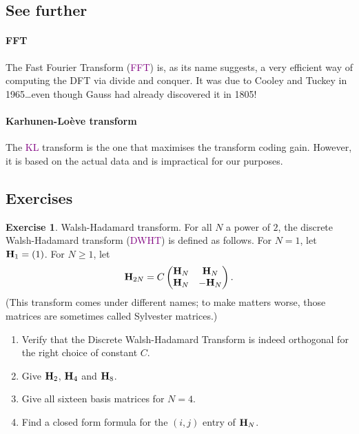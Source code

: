 \documentclass[a4paper, 11pt, openany]{book}
\numberwithin{equation}{section}
\theoremstyle{plain}
\theoremstyle{definition}
\newtheorem{exercise}   {Exercise}  [section]
\newcommand{\Define}[1]{\textcolor{purple}{#1}}
\begin{document}
\subsection{See further}

\paragraph{FFT} The Fast Fourier Transform (\Define{FFT}) is, as its name suggests, a very efficient way of computing the DFT via divide and conquer. It was due to Cooley and Tuckey in 1965\dots even though Gauss had already discovered it in 1805!


\paragraph{Karhunen-Lo\`eve transform}
The \Define{KL} transform is the one that maximises the transform coding gain. However, it is based on the actual data and is impractical for our purposes.













\subsection{Exercises}

\begin{exercise}
Walsh-Hadamard transform. For all $N$ a power of $2$, the discrete Walsh-Hadamard transform (\Define{DWHT}) is defined as follows. For $N = 1$, let ${\bf H}_1 = (1)$. For $N \ge 1$, let
\[
    {\bf H}_{2N} = C \begin{pmatrix}
    {\bf H}_N & {\bf H}_N\\
    {\bf H}_N & - {\bf H}_N
    \end{pmatrix}.
\]
(This transform comes under different names; to make matters worse, those matrices are sometimes called Sylvester matrices.)
\begin{enumerate}
    \item Verify that the Discrete Walsh-Hadamard Transform is indeed orthogonal for the right choice of constant $C$. 

    \item Give ${\bf H}_2$, ${\bf H}_4$ and ${\bf H}_8$.
    
    \item Give all sixteen basis matrices for $N = 4$.
    
    \item Find a closed form formula for the $(i,j)$ entry of ${\bf H}_N$.
\end{enumerate}
\end{exercise}
\end{document}
